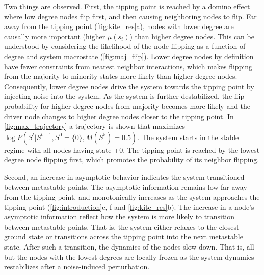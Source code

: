\documentclass[a4paper, 11pt, twocolumn]{article}
\begin{document}
Two things are observed. First, the tipping point is reached by a domino effect where low degree nodes flip first, and then causing neighboring nodes to flip. Far away from the tipping point (\cref{fig:kite_res}{a}), nodes with lower degree are causally more important (higher $\mu(s_i)$) than higher degree nodes. This can be understood by considering the likelihood of the node flipping as a function of degree and system macrostate (\cref{fig:maj_flip}). Lower degree nodes by definition have fewer constraints from nearest neighbor interactions, which makes flipping from the majority to minority states more likely than higher degree nodes. Consequently, lower degree nodes drive the system towards the tipping point by injecting noise into the system. As the system is further destabilized, the flip probability for higher degree nodes from majority becomes more likely and the driver node changes to higher degree nodes closer to the tipping point. In \cref{fig:max_trajectory} a trajectory is shown that maximizes $\log P(S^t|S^{t-1}, S^0 = \{0\}, M(S^5) = 0.5)$. The system starts in the stable regime with all nodes having state +0. The tipping point is reached by the lowest degree node flipping first, which promotes the probability of its neighbor flipping.

Second, an increase in asymptotic behavior indicates the system transitioned between metastable points. The asymptotic information remains low far away from the tipping point, and monotonically increases as the system approaches the tipping point (\cref{fig:introduction}{e, f} and \cref{fig:kite_res}{b}). The increase in a node's asymptotic information reflect how the system is more likely to transition between metastable points. That is, the system either relaxes to the closest ground state or transitions across the tipping point into the next metastable state. After such a transition, the dynamics of the nodes slow down. That is, all but the nodes with the lowest degrees are locally frozen as the system dynamics restabilizes after a noise-induced perturbation.
\end{document}
